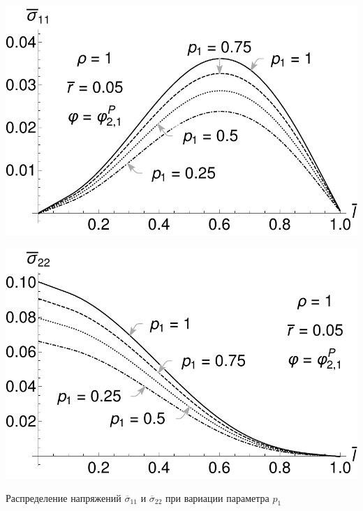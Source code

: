 \begin{frame}
\begin{minipage}{0.45\textwidth}
	\centering
	\includegraphics[width=\textwidth]{pics/ThermalKirshSigma11VariationP1.pdf} \\
\end{minipage}
\begin{minipage}{0.45\textwidth}
	\centering
	\includegraphics[width=\textwidth]{pics/ThermalKirshSigma22VariationP1.pdf} \\
\end{minipage}

Распределение напряжений $\overline{\sigma}_{11}$ и $\overline{\sigma}_{22}$ при вариации параметра $p_1$
\end{frame}
